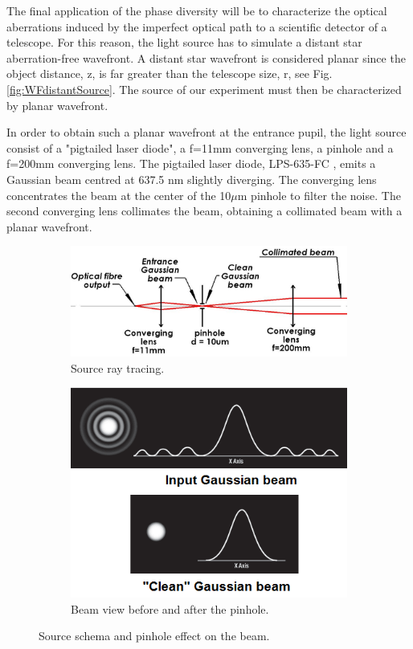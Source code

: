 The final application of the phase diversity will be to characterize the optical aberrations induced by the imperfect optical path to a scientific detector of a telescope. For this reason, the light source has to simulate a distant star aberration-free wavefront. A distant star wavefront is considered planar since the object distance, z, is far greater than the telescope size, r, see Fig. \ref{fig:WFdistantSource}. The source of our experiment must then be characterized by planar wavefront.

In order to obtain such a planar wavefront at the entrance pupil, the light source consist of a "pigtailed laser diode", a f=11mm converging lens, a pinhole and a f=200mm converging lens. The pigtailed laser diode, LPS-635-FC \citet{pigtailedLaserDiode}, emits a Gaussian beam centred at 637.5 nm slightly diverging. The converging lens concentrates the beam at the center of the 10$\mu$m pinhole to filter the noise. The second converging lens collimates the beam, obtaining a collimated beam with a planar wavefront.

\begin{figure}
\centering
    \begin{subfigure}{0.5\textwidth}
        \includegraphics[width=\textwidth]{Figures/source.png}
        \caption{Source ray tracing.}
        \label{fig:sourceRayTracing}
    \end{subfigure}
    \quad
    \begin{subfigure}{0.3\textwidth}
        \includegraphics[width=\textwidth]{Figures/pinholeEffect.png}
        \caption{Beam view before and after the pinhole.}
        \label{fig:pinholeEffect}
    \end{subfigure}
    \caption{Source schema and pinhole effect on the beam.}
\end{figure}


